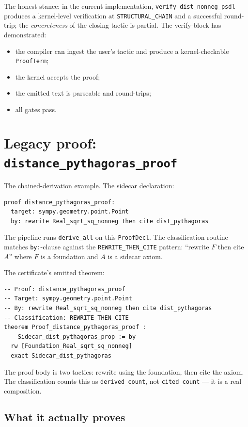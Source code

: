 The honest stance: in the current implementation, \texttt{verify
dist\_nonneg\_psdl} produces a kernel-level verification at
\texttt{STRUCTURAL\_CHAIN} and a successful \Lean{} round-trip;
the \emph{concreteness} of the closing tactic is partial.  The
verify-block has demonstrated:
\begin{itemize}[leftmargin=1.7em]
  \item the \PSDL{} compiler can ingest the user's tactic and
    produce a kernel-checkable \texttt{ProofTerm};
  \item the kernel accepts the proof;
  \item the emitted \Lean{} text is parseable and round-trips;
  \item all gates pass.
\end{itemize}

\section{Legacy proof: \texttt{distance\_pythagoras\_proof}}

The chained-derivation example.  The sidecar declaration:

\begin{lstlisting}[language=deppyfile]
proof distance_pythagoras_proof:
  target: sympy.geometry.point.Point
  by: rewrite Real_sqrt_sq_nonneg then cite dist_pythagoras
\end{lstlisting}

The pipeline runs \texttt{derive\_all} on this \texttt{ProofDecl}.
The classification routine matches \texttt{by:}-clause against the
\texttt{REWRITE\_THEN\_CITE} pattern: ``rewrite $F$ then cite $A$''
where $F$ is a foundation and $A$ is a sidecar axiom.

The certificate's emitted theorem:
\begin{lstlisting}[language=lean4]
-- Proof: distance_pythagoras_proof
-- Target: sympy.geometry.point.Point
-- By: rewrite Real_sqrt_sq_nonneg then cite dist_pythagoras
-- Classification: REWRITE_THEN_CITE
theorem Proof_distance_pythagoras_proof :
    Sidecar_dist_pythagoras_prop := by
  rw [Foundation_Real_sqrt_sq_nonneg]
  exact Sidecar_dist_pythagoras
\end{lstlisting}

The proof body is two tactics: rewrite using the foundation, then
cite the axiom.  The classification counts this as
\texttt{derived\_count}, not \texttt{cited\_count} --- it is a real
composition.

\subsection{What it actually proves}

